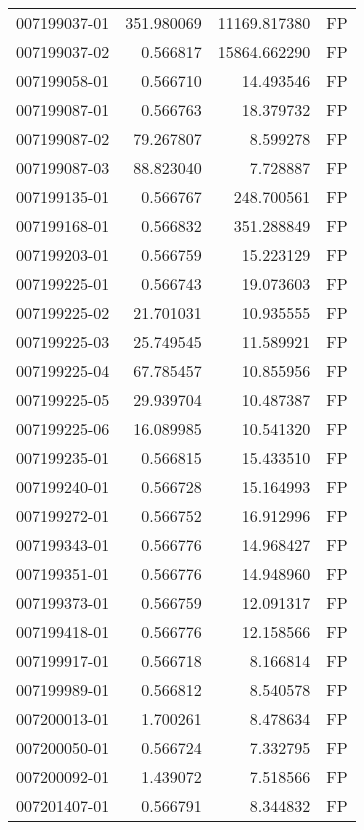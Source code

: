 \begin{tabular}{lrrl}
007199037-01 &  351.980069 &   11169.817380 &   FP \\
007199037-02 &    0.566817 &   15864.662290 &   FP \\
007199058-01 &    0.566710 &      14.493546 &   FP \\
007199087-01 &    0.566763 &      18.379732 &   FP \\
007199087-02 &   79.267807 &       8.599278 &   FP \\
007199087-03 &   88.823040 &       7.728887 &   FP \\
007199135-01 &    0.566767 &     248.700561 &   FP \\
007199168-01 &    0.566832 &     351.288849 &   FP \\
007199203-01 &    0.566759 &      15.223129 &   FP \\
007199225-01 &    0.566743 &      19.073603 &   FP \\
007199225-02 &   21.701031 &      10.935555 &   FP \\
007199225-03 &   25.749545 &      11.589921 &   FP \\
007199225-04 &   67.785457 &      10.855956 &   FP \\
007199225-05 &   29.939704 &      10.487387 &   FP \\
007199225-06 &   16.089985 &      10.541320 &   FP \\
007199235-01 &    0.566815 &      15.433510 &   FP \\
007199240-01 &    0.566728 &      15.164993 &   FP \\
007199272-01 &    0.566752 &      16.912996 &   FP \\
007199343-01 &    0.566776 &      14.968427 &   FP \\
007199351-01 &    0.566776 &      14.948960 &   FP \\
007199373-01 &    0.566759 &      12.091317 &   FP \\
007199418-01 &    0.566776 &      12.158566 &   FP \\
007199917-01 &    0.566718 &       8.166814 &   FP \\
007199989-01 &    0.566812 &       8.540578 &   FP \\
007200013-01 &    1.700261 &       8.478634 &   FP \\
007200050-01 &    0.566724 &       7.332795 &   FP \\
007200092-01 &    1.439072 &       7.518566 &   FP \\
007201407-01 &    0.566791 &       8.344832 &   FP \\

\end{tabular}
